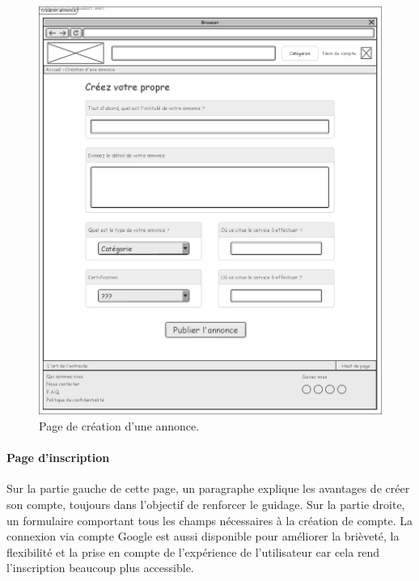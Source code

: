 \documentclass[a4paper,11pt]{article}
\begin{document}
\begin{figure}[H]
  \includegraphics[width=\linewidth]{images/maquette-creation-annonce.png}
  \caption{Page de création d'une annonce.}
  \label{fig:maquette-creation-annonce}
\end{figure}
\newpage

\paragraph{Page d'inscription}

Sur la partie gauche de cette page, un paragraphe explique les avantages de créer son compte,
toujours dans l'objectif de renforcer le guidage. Sur la partie droite, un formulaire comportant
tous les champs nécessaires à la création de compte. La connexion via compte Google est aussi
disponible pour améliorer la brièveté, la flexibilité et la prise en compte de l'expérience de
l'utilisateur car cela rend l'inscription beaucoup plus accessible.
\end{document}
